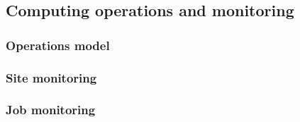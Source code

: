 \subsection{Computing operations and monitoring}
\label{sec:compops}

\subsubsection{Operations model}

\subsubsection{Site monitoring}

\subsubsection{Job monitoring}

